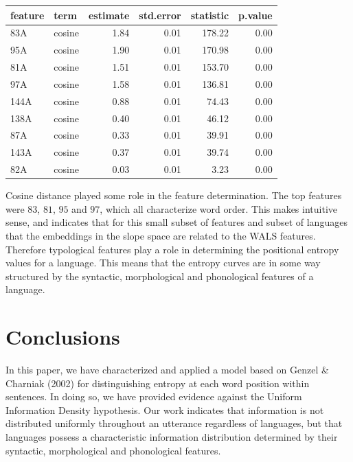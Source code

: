 \documentclass[10pt, letterpaper]{article}
\begin{document}
\begin{table}[tb]
\centering
\begin{tabular}{llrrrr}
  \hline
feature & term & estimate & std.error & statistic & p.value \\ 
  \hline
83A & cosine & 1.84 & 0.01 & 178.22 & 0.00 \\ 
  95A & cosine & 1.90 & 0.01 & 170.98 & 0.00 \\ 
  81A & cosine & 1.51 & 0.01 & 153.70 & 0.00 \\ 
  97A & cosine & 1.58 & 0.01 & 136.81 & 0.00 \\ 
  144A & cosine & 0.88 & 0.01 & 74.43 & 0.00 \\ 
  138A & cosine & 0.40 & 0.01 & 46.12 & 0.00 \\ 
  87A & cosine & 0.33 & 0.01 & 39.91 & 0.00 \\ 
  143A & cosine & 0.37 & 0.01 & 39.74 & 0.00 \\ 
  82A & cosine & 0.03 & 0.01 & 3.23 & 0.00 \\ 
   \hline
\end{tabular}
\end{table}

Cosine distance played some role in the feature determination. The top
features were \(83\), \(81\), \(95\) and \(97\), which all characterize
word order. This makes intuitive sense, and indicates that for this
small subset of features and subset of languages that the embeddings in
the slope space are related to the WALS features. Therefore typological
features play a role in determining the positional entropy values for a
language. This means that the entropy curves are in some way structured
by the syntactic, morphological and phonological features of a language.

\hypertarget{conclusions}{%
\section{Conclusions}\label{conclusions}}

In this paper, we have characterized and applied a model based on Genzel
\& Charniak (2002) for distinguishing entropy at each word position
within sentences. In doing so, we have provided evidence against the
Uniform Information Density hypothesis. Our work indicates that
information is not distributed uniformly throughout an utterance
regardless of languages, but that languages possess a characteristic
information distribution determined by their syntactic, morphological
and phonological features.
\end{document}
